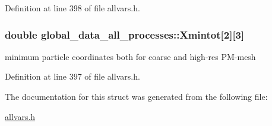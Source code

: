 Definition at line 398 of file allvars.h.

\hypertarget{structglobal__data__all__processes_a767b48fe7db038566f36edbb935d56f8}{
\subsubsection[{Xmintot}]{\setlength{\rightskip}{0pt plus 5cm}double {\bf global\_\-data\_\-all\_\-processes::Xmintot}\mbox{[}2\mbox{]}\mbox{[}3\mbox{]}}}
\label{structglobal__data__all__processes_a767b48fe7db038566f36edbb935d56f8}
minimum particle coordinates both for coarse and high-\/res PM-\/mesh 

Definition at line 397 of file allvars.h.



The documentation for this struct was generated from the following file:\begin{DoxyCompactItemize}
\item 
\hyperlink{allvars_8h}{allvars.h}\end{DoxyCompactItemize}
